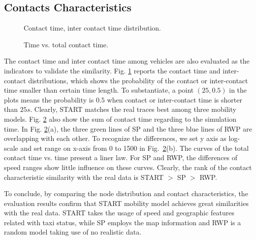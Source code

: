 \subsection{Contacts Characteristics}

\begin{figure}[!h]
\centering
{}
\caption{Contact time, inter contact time distribution.}\label{figure_contacts}
\end{figure}
\begin{figure}[!t]
\centering
{}
\caption{Time vs. total contact time.}\label{figure_total_contact_time}
\end{figure}

The contact time and inter contact time among vehicles are also evaluated as the indicators to validate the similarity.
Fig. \ref{figure_contacts} reports the contact time and inter-contact distributions, which shows the probability of the contact or inter-contact time smaller than certain time length. To substantiate, a point $(25,0.5)$ in the plots means the probability is $0.5$ when contact or inter-contact time is shorter than $25s$. Clearly, START matches the real traces best among three mobility models.
Fig. \ref{figure_total_contact_time} also show the sum of contact time regarding to the simulation time.
In Fig. \ref{figure_total_contact_time}(a), the three green lines of SP and the three blue lines of RWP are overlapping with each other.
To recognize the differences, we set y axis as log-scale and set range on x-axis from 0 to 1500 in Fig.~\ref{figure_total_contact_time}(b). The curves of the total contact time vs. time present a liner law. For SP and RWP, the differences of speed ranges show little influence on these curves.
Clearly, the rank of the contact characteristic similarity with the real data is START $>$ SP $>$ RWP.

To conclude, by comparing the node distribution and contact characteristics, the evaluation results confirm that START mobility model achieves great similarities with the real data. START takes the usage of speed and geographic features related with taxi status, while SP employs the map information and RWP is a random model taking use of no realistic data.

